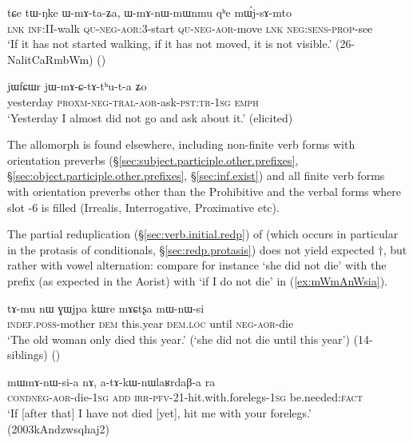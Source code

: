 \begin{exe}
	\ex \label{ex:WmAtaZa}
	\gll tɕe tɯ-ŋke ɯ-mɤ-ta-ʑa, ɯ-mɤ-nɯ-mɯnmu qʰe mɯ́j-sɤ-mto \\
	\textsc{lnk} \textsc{inf}:II-walk \textsc{qu}-\textsc{neg}-\textsc{aor}:3\flobv{}-start \textsc{qu}-\textsc{neg}-\textsc{aor}-move \textsc{lnk} \textsc{neg}:\textsc{sens}-\textsc{prop}-see \\
	\glt `If it has not started walking, if it has not moved, it is not visible.' (26-NalitCaRmbWm) ()
\end{exe}

\begin{exe}
	\ex \label{ex:jWmACtAthuta}
	\gll  jɯfɕɯr jɯ-mɤ-ɕ-tɤ-tʰu-t-a ʑo \\
	yesterday \textsc{proxm}-\textsc{neg}-\textsc{tral}-\textsc{aor}-ask-\textsc{pst}:\textsc{tr}-\textsc{1sg} \textsc{emph} \\
	\glt `Yesterday I almost did not go and ask about it.' (elicited)
\end{exe}

The allomorph  is found elsewhere, including non-finite verb forms with orientation preverbs (§\ref{sec:subject.participle.other.prefixes}, §\ref{sec:object.participle.other.prefixes}, §\ref{sec:inf.exist}) and all finite verb forms with orientation preverbs other than the Prohibitive and the verbal forms where slot -6 is filled (Irrealis, Interrogative, Proximative etc).

The partial reduplication (§\ref{sec:verb.initial.redp}) of  (which occurs in particular in the protasis of conditionals, §\ref{sec:redp.protasis}) does not yield expected $\dagger$, but rather  with vowel alternation: compare for instance  `she did not die' with the  prefix (as expected in the Aorist) with  `if I do not die' in (\ref{ex:mWmAnWsia}). 


\begin{exe}
	\ex \label{ex:mWnWsi}
	\gll  tɤ-mu nɯ ɣɯjpa kɯre mɤɕtʂa mɯ-nɯ-si \\
	\textsc{indef}.\textsc{poss}-mother \textsc{dem} this.year \textsc{dem}.\textsc{loc} until \textsc{neg}-\textsc{aor}-die \\
	\glt `The old woman only died this year.' (`she did not die until this year') (14-siblings)
()
\end{exe}

\begin{exe}
	\ex \label{ex:mWmAnWsia}
	\gll mɯ\redp{}mɤ-nɯ-si-a nɤ, a-tɤ-kɯ-nɯlaʁrdaβ-a ra \\
	\textsc{cond}\redp{}\textsc{neg}-\textsc{aor}-die-\textsc{1sg} \textsc{add} \textsc{irr}-\textsc{pfv}-2\fl{}1-hit.with.forelegs-\textsc{1sg} be.needed:\textsc{fact} \\
	\glt `If [after that] I have not died [yet], hit me with your forelegs.' (2003kAndzwsqhaj2)
\end{exe}


